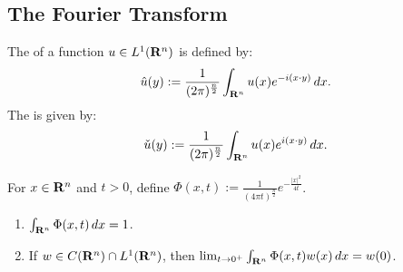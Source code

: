 \subsection{The Fourier Transform}

\begin{definition}
	The  of a function $u \in L^1(\mathbf{R}^n)$ is defined by:
	\[
		\hat{u}(y) := \frac{1}{(2\pi)^{\frac{n}{2}}} \int_{\mathbf{R}^n}^{} u(x) e^{-i (x \cdot y)}\,dx.
	\] 
	The  is given by:
	\[
		\check{u}(y) := \frac{1}{(2\pi)^{\frac{n}{2}}} \int_{\mathbf{R}^n}^{} u(x) e^{i (x \cdot y)}\,dx.
	\] 
\end{definition}



\begin{lemma}
	For $x \in \mathbf{R}^n$ and $t > 0$, define $\Phi(x,t):= \frac{1}{(4\pi t)^{\frac{n}{2}}}e^{-\frac{|x|^2}{4t}}$.
	\mbox{}
	\begin{enumerate}[label = (\arabic*),itemsep=1pt,topsep=3pt]
		\item $\int_{\mathbf{R}^n}^{} \Phi(x,t)\,dx = 1$.
		\item If $w \in C(\mathbf{R}^n) \cap L^1(\mathbf{R}^n)$, then $\lim_{t \rightarrow 0^+}\int_{\mathbf{R}^n}^{} \Phi(x,t)w(x)\,dx = w(0)$.
	\end{enumerate}
\end{lemma}
